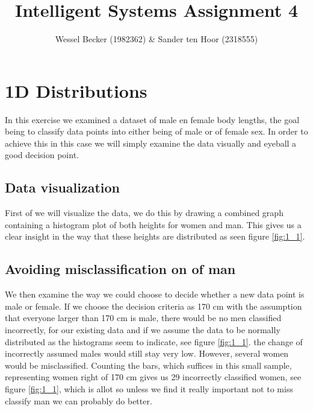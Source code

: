 \documentclass[10pt,a4paper]{article}
\begin{document}
\title{Intelligent Systems Assignment 4}
\author{Wessel Becker (1982362) \& Sander ten Hoor (2318555)}
\maketitle

\newcommand{\simplefigure}[3]{
	\begin{figure}[H]
  	\centering
    	\makebox[\textwidth]
    	{
    		\texttt{[image: \#1]}
 		} \\
  		\caption{#2}
  		\label{#3}
	\end{figure}
}
\newcommand{\mcode}[1]{
	
}

\section{1D Distributions}
In this exercise we examined a dataset of male en female body lengths, the goal being to classify data points into either being of male or of female sex. In order to achieve this in this case we will simply examine the data visually and eyeball a good decision point.

\subsection{Data visualization}
First of we will visualize the data, we do this by drawing a combined graph containing a histogram plot of both heights for women and man. This gives us a clear insight in the way that these heights are distributed as seen figure \ref{fig:1_1}. 

\subsection{Avoiding misclassification on of man}
We then examine the way we could choose to decide whether a new data point is male or female. If we choose the decision criteria as 170 cm with the assumption that everyone larger than 170 cm is male, there would be no men classified incorrectly, for our existing data and if we assume the data to be normally distributed as the histograms seem to indicate, see figure \ref{fig:1_1}. the change of incorrectly assumed males would still stay very low. However, several women would be misclassified. Counting the bars, which suffices in this small sample, representing women right of 170 cm gives us 29 incorrectly classified women, see figure \ref{fig:1_1}, which is allot so unless we find it really important not to miss classify man we can probably do better.
\end{document}
